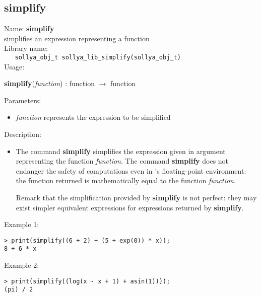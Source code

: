 \subsection{simplify}
\label{labsimplify}
\noindent Name: \textbf{simplify}\\
\phantom{aaa}simplifies an expression representing a function\\[0.2cm]
\noindent Library name:\\
\verb|   sollya_obj_t sollya_lib_simplify(sollya_obj_t)|\\[0.2cm]
\noindent Usage: 
\begin{center}
\textbf{simplify}(\emph{function}) : \textsf{function} $\rightarrow$ \textsf{function}\\
\end{center}
Parameters: 
\begin{itemize}
\item \emph{function} represents the expression to be simplified
\end{itemize}
\noindent Description: \begin{itemize}

\item The command \textbf{simplify} simplifies the expression given in argument
   representing the function \emph{function}.  The command \textbf{simplify} does not
   endanger the safety of computations even in \sollya's floating-point
   environment: the function returned is mathematically equal to the
   function \emph{function}. 
    
   Remark that the simplification provided by \textbf{simplify} is not perfect:
   they may exist simpler equivalent expressions for expressions returned
   by \textbf{simplify}.
\end{itemize}
\noindent Example 1: 
\begin{center}\begin{minipage}{15cm}\begin{Verbatim}[frame=single,commandchars=\\\|\~]
> print(simplify((6 + 2) + (5 + exp(0)) * x));
8 + 6 * x
\end{Verbatim}
\end{minipage}\end{center}
\noindent Example 2: 
\begin{center}\begin{minipage}{15cm}\begin{Verbatim}[frame=single,commandchars=\\\|\~]
> print(simplify((log(x - x + 1) + asin(1))));
(pi) / 2
\end{Verbatim}
\end{minipage}\end{center}
